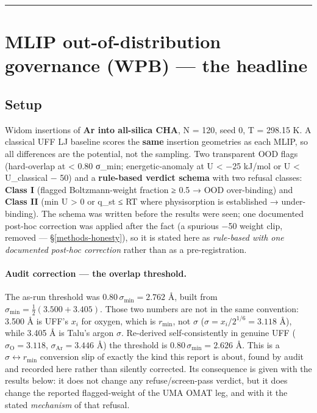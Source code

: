 \begin{center}\rule{0.5\linewidth}{0.5pt}\end{center}

\section{MLIP out-of-distribution governance (WPB) --- the
headline}\label{mlip-out-of-distribution-governance-wpb-the-headline}

\subsection{Setup}\label{setup}

Widom insertions of \textbf{Ar into all-silica CHA}, N = 120, seed 0, T
= 298.15 K. A classical UFF LJ baseline scores the \textbf{same}
insertion geometries as each MLIP, so all differences are the potential,
not the sampling. Two transparent OOD flags (hard-overlap at \textless{}
0.80 σ\_min; energetic-anomaly at U \textless{} −25 kJ/mol or
U \textless{} U\_classical − 50) and a \textbf{rule-based verdict
schema} with two refusal classes: \textbf{Class I} (flagged
Boltzmann-weight fraction ≥ 0.5 → OOD over-binding) and \textbf{Class
II} (min U \textgreater{} 0 or q\_st ≤ RT where physisorption is
established → under-binding). The schema was written before the results
were seen; one documented post-hoc correction was applied after the
fact (a spurious −50 weight clip, removed --- §\ref{methods-honesty}),
so it is stated here as \emph{rule-based with one documented post-hoc
correction} rather than as a pre-registration.

\paragraph{Audit correction --- the overlap threshold.} The as-run
threshold was \(0.80\,\sigma_{\min} = 2.762\) Å, built from
\(\sigma_{\min} = \tfrac{1}{2}(3.500 + 3.405)\). Those two numbers are
not in the same convention: 3.500 Å is UFF's \(x_i\) for oxygen, which
is \(r_{\min}\), not \(\sigma\) (\(\sigma = x_i/2^{1/6} = 3.118\) Å),
while 3.405 Å is Talu's argon \(\sigma\). Re-derived self-consistently
in genuine UFF (\(\sigma_{\mathrm{O}} = 3.118\),
\(\sigma_{\mathrm{Ar}} = 3.446\) Å) the threshold is
\(0.80\,\sigma_{\min} = 2.626\) Å. This is a \(\sigma \leftrightarrow
r_{\min}\) conversion slip of exactly the kind this report is about,
found by audit and recorded here rather than silently corrected. Its
consequence is given with the results below: it does not change any
refuse/screen-pass verdict, but it does change the reported
flagged-weight of the UMA OMAT leg, and with it the stated
\emph{mechanism} of that refusal.

